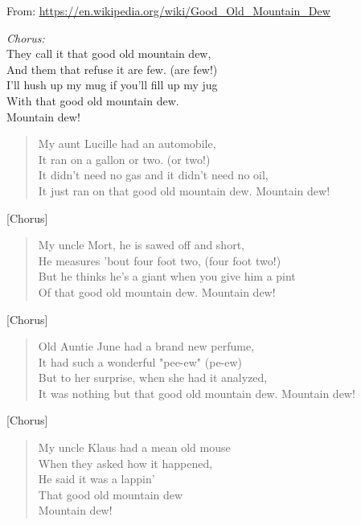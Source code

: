 
From: \url{https://en.wikipedia.org/wiki/Good_Old_Mountain_Dew} \\

\begin{center}
\textit{Chorus:} \\
They call it that good old mountain dew, \\
And them that refuse it are few. (are few!) \\
I'll hush up my mug if you'll fill up my jug \\
With that good old mountain dew. \\
Mountain dew! \\
\end{center}

\begin{verse}
My aunt Lucille had an automobile, \\
It ran on a gallon or two. (or two!) \\
It didn't need no gas and it didn't need no oil, \\
It just ran on that good old mountain dew. Mountain dew! \\
\end{verse}

[Chorus]

\begin{verse}
My uncle Mort, he is sawed off and short, \\
He measures 'bout four foot two, (four foot two!) \\
But he thinks he's a giant when you give him a pint \\
Of that good old mountain dew. Mountain dew! \\
\end{verse}

[Chorus]

\begin{verse}
Old Auntie June had a brand new perfume, \\
It had such a wonderful "pee-ew" (pe-ew) \\
But to her surprise, when she had it analyzed, \\
It was nothing but that good old mountain dew. Mountain dew! \\
\end{verse}

[Chorus]

\begin{verse}
My uncle Klaus had a mean old mouse \\
When they asked how it happened, \\
He said it was a lappin' \\
That good old mountain dew \\
Mountain dew! \\
\end{verse}

